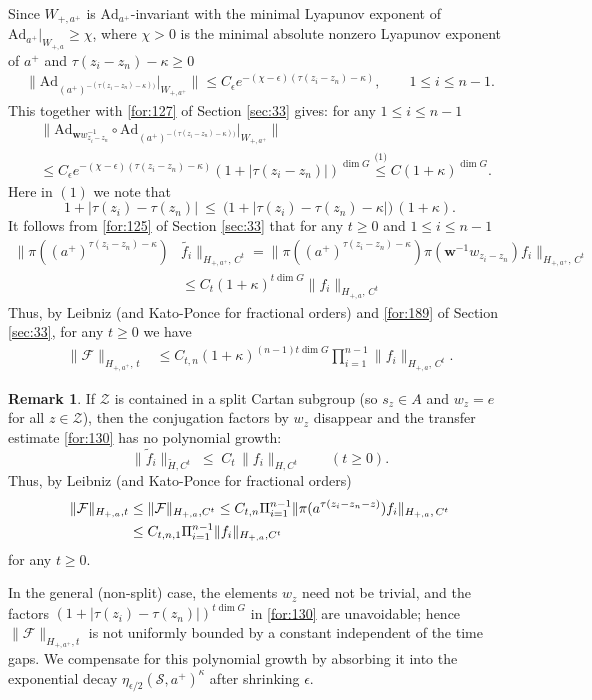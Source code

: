 \documentclass[11 pt]{amsart}
\theoremstyle{definition}
\newtheorem{remark}[theorem]{Remark}
\numberwithin{equation}{section}
\begin{document}
Since $W_{+,a^+}$ is $\text{Ad}_{a^+}$-invariant with the minimal Lyapunov exponent of $\text{Ad}_{a^+}|_{W_{+,a}}\geq \chi$, where $\chi>0$ is the minimal absolute nonzero Lyapunov exponent of $a^+$ and $\tau(z_i-z_{n})-\kappa\ge0$
\begin{align*}
 \big\|\text{Ad}_{(a^+)^{-(\tau(z_i-z_{n})-\kappa))}}\big|_{W_{+,a^+}}\big\|\leq C_\epsilon e^{-(\chi-\epsilon)(\tau(z_i-z_{n})-\kappa)}, \qquad 1\leq i\leq n-1.
\end{align*}
This together with \eqref{for:127} of Section \ref{sec:33} gives: for any $1\leq i\leq n-1$
\begin{align*}
 &\big\|\text{Ad}_{\textbf{w}w_{z_i-z_n}^{-1}}\circ\text{Ad}_{(a^+)^{-(\tau(z_i-z_{n})-\kappa))}}\big|_{W_{+,a^+}}\big\|\\
 &\leq C_\epsilon e^{-(\chi-\epsilon)(\tau(z_i-z_{n})-\kappa)}(1+|\tau(z_i-z_n)|)^{\dim G}\overset{\text{(1)}}{\leq}C(1+\kappa)^{\dim G}.
\end{align*}
Here in $(1)$ we note that
\[
1+|\tau(z_i)-\tau(z_n)|\ \le\ \big(1+|\tau(z_i)-\tau(z_n)-\kappa|\big)\,(1+\kappa).
\]
It follows from \eqref{for:125} of Section \ref{sec:33} that for any $t\geq0$ and $1\leq i\leq n-1$
\begin{align*}
 \big\|\pi((a^+)^{\tau(z_i-z_n)-\kappa})&\widetilde{f_i}\big\|_{H_{+,a^+},\,C^{t}}=\big\|\pi((a^+)^{\tau(z_i-z_n)-\kappa})\pi(\textbf{w}^{-1}w_{z_i-z_n})f_i\big\|_{H_{+,a^+},\,C^{t}}\\
 &\leq C_t(1+\kappa)^{t\dim G}\big\|f_i\big\|_{H_{+,a},\,C^{t}}
\end{align*}
 Thus, by Leibniz
(and Kato-Ponce for fractional orders) and \eqref{for:189} of Section \ref{sec:33},  for any $t\geq0$ we have
\begin{align}\label{for:133}
\|\mathcal F\|_{H_{+,a^+},\,t}&\le C_{t,n}(1+\kappa)^{(n-1)t\dim G}\prod_{i=1}^{n-1}\|f_i\|_{H_{+,a},\,C^t}.
\end{align}
\begin{remark}
If $\mathcal Z$ is contained in a split Cartan subgroup (so $s_z\in A$ and $w_z=e$ for all $z\in\mathcal Z$), then the conjugation factors by $w_z$ disappear and the transfer estimate \eqref{for:130} has no polynomial growth:
\[
\|\widetilde f_i\|_{\tilde H,C^t}\;\le\; C_t\,\|f_i\|_{H,C^t}\qquad (t\ge0).
\]
Thus, by Leibniz
(and Kato-Ponce for fractional orders)
\begin{align}\label{for:126}
\|\mathcal F\|_{H_{+,a},t}&\leq\|\mathcal F\|_{H_{+,a},C^t}\le C_{t,n}\Pi_{i=1}^{n-1} \|\pi(a^{\tau(z_i-z_n-z)})f_i\|_{H_{+,a},\,C^{t}}\notag\\
&\leq  C_{t,n,1}\Pi_{i=1}^{n-1}\|f_i\|_{H_{+,a},C^t}
\end{align}
for any $t\ge0$.

In the general (non-split) case, the elements $w_z$ need not be trivial, and the factors $(1+|\tau(z_i)-\tau(z_n)|)^{t\dim G}$ in \eqref{for:130} are unavoidable; hence $\|\mathcal F\|_{H_{+,a^+},t}$ is not uniformly bounded by a constant independent of the time gaps. We compensate for this polynomial growth by absorbing it into the exponential decay $\eta_{\epsilon/2}(\mathcal S,a^+)^{\kappa}$ after shrinking $\epsilon$.
\end{remark}
\end{document}
